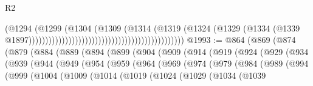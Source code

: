\begin{lexlean}{R2}
\begin{coremodule}
                                                                              (@1294
                                                                                (@1299
                                                                                  (@1304
                                                                                    (@1309
                                                                                      (@1314
                                                                                        (@1319
                                                                                          (@1324
                                                                                            (@1329
                                                                                              (@1334
                                                                                                (@1339
                                                                                                  @1897)))))))))))))))))))))))))))))))))))))))))))))))
@1993 := @864
    (@869
      (@874
        (@879
          (@884
            (@889
              (@894
                (@899
                  (@904
                    (@909
                      (@914
                        (@919
                          (@924
                            (@929
                              (@934
                                (@939
                                  (@944
                                    (@949
                                      (@954
                                        (@959
                                          (@964
                                            (@969
                                              (@974
                                                (@979
                                                  (@984
                                                    (@989
                                                      (@994
                                                        (@999
                                                          (@1004
                                                            (@1009
                                                              (@1014
                                                                (@1019
                                                                  (@1024
                                                                    (@1029
                                                                      (@1034
                                                                        (@1039

\end{coremodule}
\end{lexlean}
